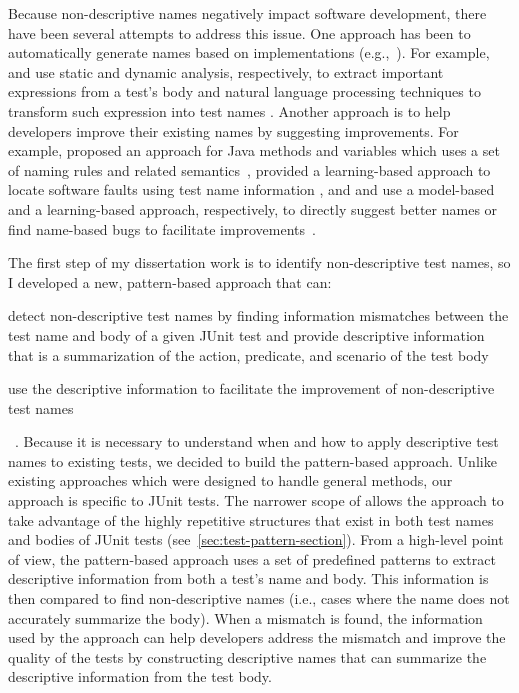 Because non-descriptive names negatively impact software development, there have been several attempts to address this issue.
%
One approach has been to automatically generate names based on implementations (e.g.,~\cite{arcuri2014automated, zhang2015automatically, daka2017generating}).
%
For example, \citeauthor{zhang2015automatically} and \citeauthor{daka2017generating} use static and dynamic analysis, respectively, to extract important expressions from a test's body and natural language processing techniques to transform such expression into test names \cite{zhang2015automatically, daka2017generating}. 
%
Another approach is to help developers improve their existing names by suggesting improvements.
%
For example, \citeauthor{host2009debugging} proposed an approach for Java methods and variables which uses a set of naming rules and related semantics~\cite{host2009debugging}, \citeauthor{li2019deepfl} provided a learning-based approach to locate software faults using test name information \cite{li2019deepfl}, and \citeauthor{allamanis2015suggesting} and \citeauthor{pradel2018deepbugs} use a model-based and a learning-based approach, respectively, to directly suggest better names or find name-based bugs to facilitate improvements~\cite{allamanis2015suggesting, pradel2018deepbugs}.


The first step of my dissertation work is to identify non-descriptive test names, so I developed a new, pattern-based approach that can:
\begin{enumerate*}
\item detect non-descriptive test names by finding information mismatches between the test name and body of a given JUnit test and provide descriptive information that is a summarization of the action, predicate, and scenario of the test body
\item use the descriptive information to facilitate the improvement of non-descriptive test names
\end{enumerate*}~\cite{wu2020pattern}.
%
Because it is necessary to understand when and how to apply descriptive test names to existing tests, we decided to build the pattern-based approach.
%
Unlike existing approaches which were designed to handle general methods, our approach is specific to JUnit tests.
%
The narrower scope of allows the approach to take advantage of the highly repetitive structures that exist in both test names and bodies of JUnit tests (see~\cref{sec:test-pattern-section}).
%
From a high-level point of view, the pattern-based approach uses a set of predefined patterns to extract descriptive information from both a test's name and body.
%
This information is then compared to find non-descriptive names (i.e., cases where the name does not accurately summarize the body).
%
When a mismatch is found, the information used by the approach can help developers address the mismatch and improve the quality of the tests by constructing descriptive names that can summarize the descriptive information from the test body.


